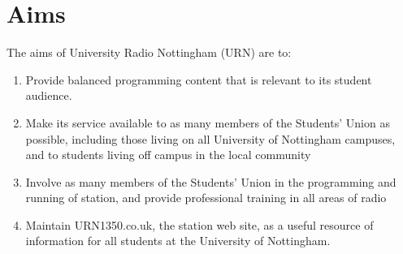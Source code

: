 \section{Aims}

The aims of University Radio Nottingham (URN) are to:

\begin{enumerate}[label*=\thesection.\arabic*.]
    \item Provide balanced programming content that is relevant to its student audience.
    \item Make its service available to as many members of the Students' Union as possible, including those living on all University of Nottingham campuses, and to students living off campus in the local community
    \item Involve as many members of the Students' Union in the programming and running of station, and provide professional training in all areas of radio
    \item Maintain URN1350.co.uk, the station web site, as a useful resource of information for all students at the University of Nottingham.
\end{enumerate}

